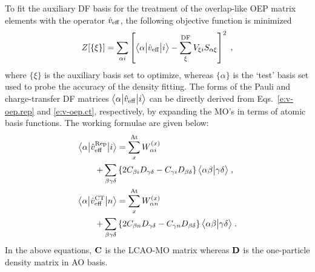 To fit the auxiliary DF basis for the treatment of the overlap\hyp{}like
OEP matrix elements with the operator $\hat{v}_{\rm eff}$, 
the following objective function is minimized
%
\begin{equation} \label{e:a1-obj}
 Z[\{\xi\}] = \sum_{\alpha i} \left[ 
     \bigl\langle {\alpha} \bigl\lvert {\hat{v}_{\rm eff}} \bigl\lvert {i} \bigr\rangle - 
     \sum_{\xi}^{\rm DF} V_{\xi i} S_{\alpha \xi} 
    \right]^2 \;,
\end{equation}
%
where $\{\xi\}$ is the auxiliary basis set to optimize, whereas $\{\alpha\}$
is the `test' basis set used to probe the accuracy of the density fitting.
The forms of the Pauli and charge\hyp{}transfer DF matrices $\bigl\langle {\alpha} \bigl\lvert {\hat{v}_{\rm eff}} \bigl\lvert {i} \bigr\rangle$
can be directly derived from Eqs.~\eqref{e:v-oep.rep} and \eqref{e:v-oep.ct}, respectively, 
by expanding the MO's in terms of atomic basis functions. The working formulae
are given below:
%
\begin{subequations} \label{e:a1-v.oep}
 \begin{align}
   \bigl\langle {\alpha} \bigl\lvert {\hat{v}_{\rm eff}^{\rm Rep}} \bigl\lvert {i} \bigr\rangle
     &= \sum_{x}^{\rm At} W_{\alpha i}^{(x)} \nonumber   \\ 
        + \sum_{\beta\gamma\delta} &
           \left\{ 
             2 C_{\beta i} D_{\gamma\delta} - C_{\gamma i} D_{\beta \delta}
           \right\}
           \bigl\langle {\alpha\beta} \bigl\lvert {\gamma\delta} \bigr\rangle \;,\\
   \bigl\langle {\alpha} \bigl\lvert {\hat{v}_{\rm eff}^{\rm CT}} \bigl\lvert {n} \bigr\rangle 
     &= \sum_{x}^{\rm At} W_{\alpha n}^{(x)} \nonumber   \\
       + \sum_{\beta\gamma\delta} &
           \left\{
             2 C_{\beta n} D_{\gamma\delta} - C_{\gamma n} D_{\beta \delta}
           \right\}
           \bigl\langle {\alpha\beta} \bigl\lvert {\gamma\delta} \bigr\rangle
    \;.
 \end{align}
\end{subequations}
%
In the above equations, ${\bf C}$ is the LCAO\hyp{}MO matrix whereas ${\bf D}$
is the one\hyp{}particle density matrix in AO basis.

